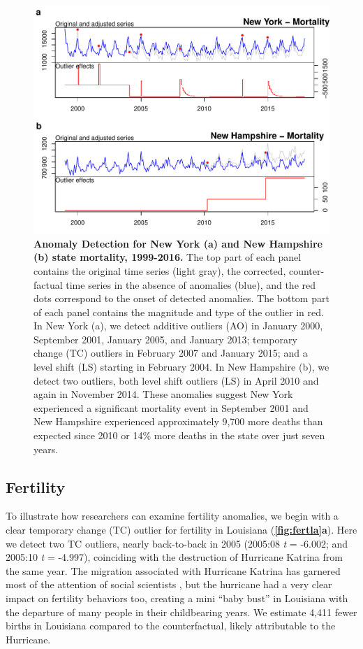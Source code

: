 \documentclass[12pt]{article}
\begin{document}
\begin{figure}
\centering
\includegraphics{manuscript_files/figure-latex/MortalityAnomalies-1.pdf}
\caption{\textbf{Anomaly Detection for New York (a) and New Hampshire (b) state mortality, 1999-2016.}
The top part of each panel contains the original time series (light
gray), the corrected, counter-factual time series in the absence of
anomalies (blue), and the red dots correspond to the onset of detected
anomalies. The bottom part of each panel contains the magnitude and type
of the outlier in red. In New York (a), we detect additive outliers (AO)
in January 2000, September 2001, January 2005, and January 2013;
temporary change (TC) outliers in February 2007 and January 2015; and a
level shift (LS) starting in February 2004. In New Hampshire (b), we
detect two outliers, both level shift outliers (LS) in April 2010 and
again in November 2014. These anomalies suggest New York experienced a
significant mortality event in September 2001 and New Hampshire
experienced approximately 9,700 more deaths than expected since 2010 or
14\% more deaths in the state over just seven years.
\label{fig:mortnewhamp}}
\end{figure}

\hypertarget{fertility}{%
\subsection{Fertility}\label{fertility}}

To illustrate how researchers can examine fertility anomalies, we begin
with a clear temporary change (TC) outlier for fertility in Louisiana
(\textbf{\autoref{fig:fertla}a}). Here we detect two TC outliers, nearly
back-to-back in 2005 (2005:08 \emph{t} = -6.002; and 2005:10 \emph{t} =
-4.997), coinciding with the destruction of Hurricane Katrina from the
same year. The migration associated with Hurricane Katrina has garnered
most of the attention of social scientists
\citep{fussellRecoveryMigrationCity2014, horiDisplacementDynamicsSouthern2009},
but the hurricane had a very clear impact on fertility behaviors too,
creating a mini ``baby bust'' in Louisiana with the departure of many
people in their childbearing years. We estimate 4,411 fewer births in
Louisiana compared to the counterfactual, likely attributable to the
Hurricane.
\end{document}
